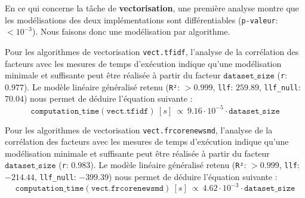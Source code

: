 			En ce qui concerne la tâche de \textbf{vectorisation}, une première analyse montre que les modélisations des deux implémentations sont différentiables (\texttt{p-valeur}: $< 10^{-3}$). Nous faisons donc une modélisation par algorithme.
		
			Pour les algorithmes de vectorisation \texttt{vect.tfidf}, l'analyse de la corrélation des facteurs avec les mesures de temps d'exécution indique qu'une modélisation minimale et suffisante peut être réalisée à partir du facteur $\texttt{dataset\_size}$ (\texttt{r}: $0.977$).
			Le modèle linéaire généralisé retenu (\texttt{R²}: $> 0.999$, \texttt{llf}: $259.89$, \texttt{llf\_null}: $70.04$) nous permet de déduire l'équation suivante :
			\begin{equation}
				\texttt{computation\_time}(\texttt{vect.tfidf})~[s]~
				\propto~9.16 \cdot 10^{-5} \cdot \texttt{dataset\_size}
			\end{equation}
			
			Pour les algorithmes de vectorisation \texttt{vect.frcorenewsmd}, l'analyse de la corrélation des facteurs avec les mesures de temps d'exécution indique qu'une modélisation minimale et suffisante peut être réalisée à partir du facteur $\texttt{dataset\_size}$ (\texttt{r}: $0.983$).
			Le modèle linéaire généralisé retenu (\texttt{R²}: $> 0.999$, \texttt{llf}: $-214.44$, \texttt{llf\_null}: $-399.39$) nous permet de déduire l'équation suivante :
			\begin{equation}
				\texttt{computation\_time}(\texttt{vect.frcorenewsmd})~[s]~
				\propto~4.62 \cdot 10^{-3} \cdot \texttt{dataset\_size}
			\end{equation}
			
